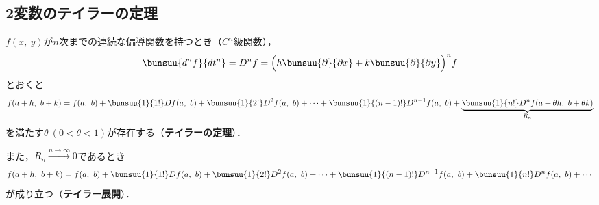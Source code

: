 \subsection{2変数のテイラーの定理}

$f(x,\ y)$が$n$次までの連続な偏導関数を持つとき（$C^n$級関数），
\begin{equation*}
	\bunsuu{d^n f}{dt^n} = D^n f = \Bigl(h\bunsuu{\partial}{\partial x} + k\bunsuu{\partial}{\partial y}\Bigr)^n f
\end{equation*}
とおくと
\begin{equation}
	f(a + h,\ b + k) = f(a,\ b) + \bunsuu{1}{1!}Df(a,\ b) + \bunsuu{1}{2!}D^2f(a,\ b) + \cdots + \bunsuu{1}{(n - 1)!}D^{n - 1}f(a,\ b) + 
	\underbrace{
		\bunsuu{1}{n!}D^n f(a + \theta h,\ b + \theta k)
	}_{R_n}
\end{equation}
を満たす$\theta\ (0 < \theta < 1)$が存在する（\textbf{テイラーの定理}）．

また，$R_n \xrightarrow{n \to \infty} 0$であるとき
\begin{equation}
	f(a + h,\ b + k) = f(a,\ b) + \bunsuu{1}{1!}Df(a,\ b) + \bunsuu{1}{2!}D^2f(a,\ b) + \cdots + \bunsuu{1}{(n - 1)!}D^{n - 1}f(a,\ b) + \bunsuu{1}{n!}D^n f(a,\ b) + \cdots
\end{equation}
が成り立つ（\textbf{テイラー展開}）．

